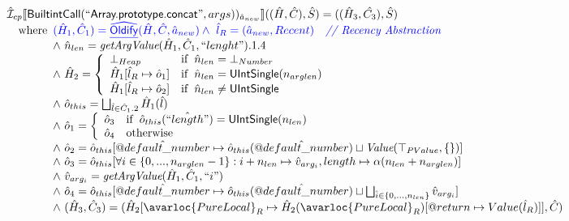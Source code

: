 \[\begin{array}{l}
\aI _{cp}\lbr \SF{BuiltintCall}(``\SF{Array.prototype.concat}",args))_{\hat{a}_{new}}\rbr((\hat{H},\hat{C}), \hat{S})
  = ((\hat{H}_3, \hat{C_3}), \hat{S})\\
\quad\wherec{
  \inblue (\hat{H}_1, \hat{C}_1) = \ahf{Oldify}(\hat{H}, \hat{C}, \hat{a}_{new})
  \land\ \inblue\hat{l}_{R} = (\hat{a}_{new}, Recent)
    \quad\comment{{\inblue // Recency Abstraction}}\\
  \land\ \hat{n}_{len} = \hf{getArgValue}(\hat{H}_1, \hat{C}_1, ``lenght").1.4\\
  \land\ \hat{H}_2 = \left\{\begin{array}{ll}
      \bot_{Heap} & \ifc{\hat{n}_{len} = \bot_{Number}}\\
      \hat{H}_1[\hat{l}_R \mapsto \hat{o}_1] & \ifc{\hat{n}_{len} = \SF{UIntSingle}(n_{arglen})}\\
      \hat{H}_1[\hat{l}_R \mapsto \hat{o}_2] & \ifc{\hat{n}_{len} \neq \SF{UIntSingle}}
    \end{array}\right.\\
  \land\ \hat{o}_{this} = \bigsqcup_{\hat{l} \in \hat{C}_1.2} \hat{H}_1(\hat{l})\\
  \land\ \hat{o}_1 = \left\{\begin{array}{ll}
      \hat{o}_3 & \ifc{\hat{o}_{this}(\hat{``length"}) = \SF{UIntSingle}(n_{len})}\\
      \hat{o}_4 & \owc
    \end{array}\right.\\
  \land\ \hat{o}_2 = \hat{o}_{this}[\avarprop{default\_number}
    \mapsto \hat{o}_{this}(\avarprop{default\_number}) \sqcup \Value(\top_{PValue}, \set{})]\\
  \land\ \hat{o}_3 = \hat{o}_{this}[\forall i \in \{0, ..., n_{arglen}-1\}: i + n_{len}
    \mapsto \hat{v}_{arg_i}, length \mapsto \alpha(n_{len} + n_{arglen})]\\
  \land\ \hat{v}_{arg_i} = \hf{getArgValue}(\hat{H}_1, \hat{C}_1, ``i")\\
  \land\ \hat{o}_4 = \hat{o}_{this}[\avarprop{default\_number}
    \mapsto \hat{o}_{this}(\avarprop{default\_number}) 
    \sqcup \bigsqcup_{\hat{i} \in \{0, ..., n_{len}\}} \hat{v}_{arg_i}]\\
  \land\ (\hat{H}_3, \hat{C}_3) = 
      (\hat{H}_2[\avarloc{PureLocal}_R \mapsto \hat{H}_2(\avarloc{PureLocal}_R)[\varprop{return} \mapsto Value(\hat{l}_R)]], \hat{C})\\
  }\\
\\\\




\end{array}\]

